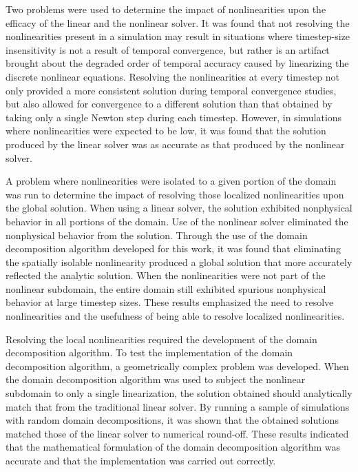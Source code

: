 Two problems were used to determine the impact of nonlinearities upon the efficacy of the linear and the nonlinear solver.
It was found that not resolving the nonlinearities present in a simulation may result in situations where timestep-size insensitivity is not a result of temporal convergence, but rather is an artifact brought about the degraded order of temporal accuracy caused by linearizing the discrete nonlinear equations.
Resolving the nonlinearities at every timestep not only provided a more consistent solution during temporal convergence studies, but also allowed for convergence to a different solution than that obtained by taking only a single Newton step during each timestep.
However, in simulations where nonlinearities were expected to be low, it was found that the solution produced by the linear solver was as accurate as that produced by the nonlinear solver.

A problem where nonlinearities were isolated to a given portion of the domain was run to determine the impact of resolving those localized nonlinearities upon the global solution.
When using a linear solver, the solution exhibited nonphysical behavior in all portions of the domain.
Use of the nonlinear solver eliminated the nonphysical behavior from the solution.
Through the use of the domain decomposition algorithm developed for this work, it was found that eliminating the spatially isolable nonlinearity produced a global solution that more accurately reflected the analytic solution.
When the nonlinearities were not part of the nonlinear subdomain, the entire domain still exhibited spurious nonphysical behavior at large timestep sizes.
These results emphasized the need to resolve nonlinearities and the usefulness of being able to resolve localized nonlinearities.

Resolving the local nonlinearities required the development of the domain decomposition algorithm. 
To test the implementation of the domain decomposition algorithm, a geometrically complex problem was developed.
When the domain decomposition algorithm was used to subject the nonlinear subdomain to only a single linearization, the solution obtained should analytically match that from the traditional linear solver.
By running a sample of simulations with random domain decompositions, it was shown that the obtained solutions matched those of the linear solver to numerical round-off.
These results indicated that the mathematical formulation of the domain decomposition algorithm was accurate and that the implementation was carried out correctly.

